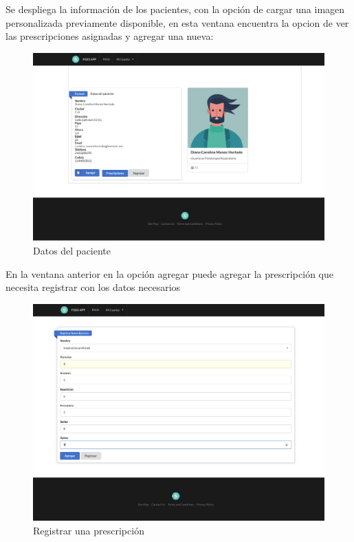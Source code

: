 \documentclass[12pt]{article}
\begin{document}
Se despliega la información de los pacientes, con la opción de cargar una imagen personalizada previamente disponible, en esta ventana encuentra la opcion de ver las prescripciones asignadas y agregar una nueva:


\begin{figure}[ht]
\centering
\includegraphics[scale=0.3]{imag/appverdatosusuarios2.png}
\caption{Datos del paciente}
\label{6}
\end{figure}
\FloatBarrier

En la ventana anterior en la opción agregar puede agregar la prescripción que necesita registrar con los datos necesarios


\begin{figure}[ht]
\centering
\includegraphics[scale=0.3]{imag/appregistrarpreescripcion.png}
\caption{Registrar una prescripción}
\label{6}
\end{figure}
\FloatBarrier
\end{document}
